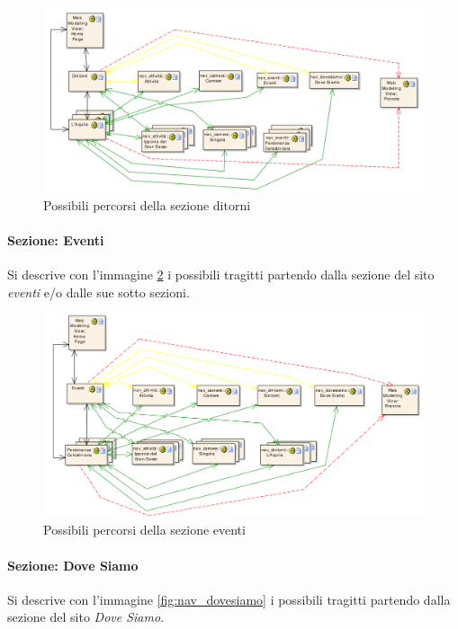 \documentclass[a4paper,12pt,hidelinks]{report}
\begin{document}
\begin{figure}[h!]%
    \includegraphics[width=1.1\textwidth,keepaspectratio=true]{../img/nav_dintorni}
    \centering
    \caption{Possibili percorsi della sezione ditorni}%
    \label{fig:nav_dintorni}%
\end{figure}

\newpage
\paragraph{Sezione: Eventi}
Si descrive con l'immagine \ref{fig:nav_eventi} i possibili tragitti partendo dalla sezione del sito \textit{eventi} e/o dalle sue sotto sezioni.

\begin{figure}[h!]%
    \includegraphics[width=1.1\textwidth,keepaspectratio=true]{../img/nav_eventi}
    \centering
    \caption{Possibili percorsi della sezione eventi}%
    \label{fig:nav_eventi}%
\end{figure}

\newpage
\paragraph{Sezione: Dove Siamo}
Si descrive con l'immagine \ref{fig:nav_dovesiamo} i possibili tragitti partendo dalla sezione del sito \textit{Dove Siamo}.
\end{document}
